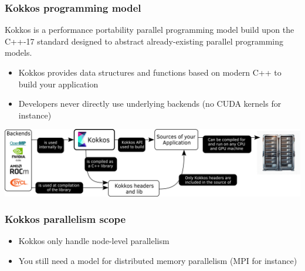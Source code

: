 \documentclass[aspectratio=169]{beamer}
\begin{document}

\begin{frame}
    \frametitle{Kokkos programming model}

    Kokkos is a performance portability parallel programming model build upon the C++-17 standard designed to abstract already-existing parallel programming models.

    \hspace{0.5cm}

    \begin{itemize}
        \item Kokkos provides data structures and functions based on modern C++ to build your application
        \item Developers never directly use underlying backends (no CUDA kernels for instance)
    \end{itemize}

    \begin{center}
        \includegraphics[width=1\textwidth]{../../images/kokkos_model.png}
    \end{center}

\end{frame}


\begin{frame}
    \frametitle{Kokkos parallelism scope}

    \begin{itemize}
        \item Kokkos only handle node-level parallelism
        \item You still need a model for distributed memory parallelism (MPI for instance)
    \end{itemize}


\end{frame}

\end{document}
